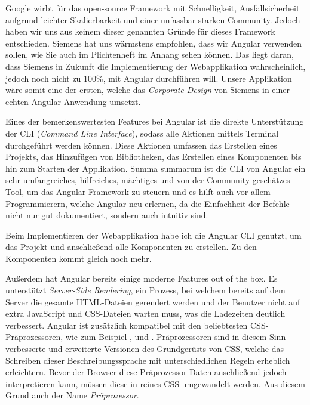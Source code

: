 Google wirbt für das open-source Framework mit Schnelligkeit, Ausfallsicherheit aufgrund leichter Skalierbarkeit und einer unfassbar starken Community. Jedoch haben wir uns aus keinem dieser genannten Gründe für dieses Framework entschieden. Siemens hat uns wärmstens empfohlen, dass wir Angular verwenden sollen, wie Sie auch im Plichtenheft im Anhang sehen können. Das liegt daran, dass Siemens in Zukunft die Implementierung der Webapplikation wahrscheinlich, jedoch noch nicht zu 100\%, mit Angular durchführen will. Unsere Applikation wäre somit eine der ersten, welche das \emph{Corporate Design} von Siemens in einer echten Angular-Anwendung umsetzt. \cite{AngularFeatures}

Eines der bemerkenswertesten Features bei Angular ist die direkte Unterstützung der CLI (\emph{Command Line Interface}), sodass alle Aktionen mittels Terminal durchgeführt werden können. Diese Aktionen umfassen das Erstellen eines Projekts, das Hinzufügen von Bibliotheken, das Erstellen eines Komponenten bis hin zum Starten der Applikation. Summa summarum ist die CLI von Angular ein sehr umfangreiches, hilfreiches, mächtiges und von der Community geschätzes Tool, um das Angular Framework zu steuern und es hilft auch vor allem Programmierern, welche Angular neu erlernen, da die Einfachheit der Befehle nicht nur gut dokumentiert, sondern auch intuitiv sind. \cite{AngularCLI}

Beim Implementieren der Webapplikation habe ich die Angular CLI genutzt, um das Projekt und anschließend alle Komponenten zu erstellen. Zu den Komponenten kommt gleich noch mehr.

Außerdem hat Angular bereits einige moderne Features out of the box. Es unterstützt \emph{Server-Side Rendering}, ein Prozess, bei welchem bereits auf dem Server die gesamte HTML-Dateien gerendert werden und der Benutzer nicht auf extra JavaScript und CSS-Dateien warten muss, was die Ladezeiten deutlich verbessert. Angular ist zusätzlich kompatibel mit den beliebtesten CSS-Präprozessoren, wie zum Beispiel ,  und . Präprozessoren sind in diesem Sinn verbesserte und erweiterte Versionen des Grundgerüsts von CSS, welche das Schreiben dieser Beschreibungssprache mit unterschiedlichen Regeln erheblich erleichtern. Bevor der Browser diese Präprozessor-Daten anschließend jedoch interpretieren kann, müssen diese in reines CSS umgewandelt werden. Aus diesem Grund auch der Name \emph{Präprozessor}. \cite{AngularFeatures,AngularStyling}

